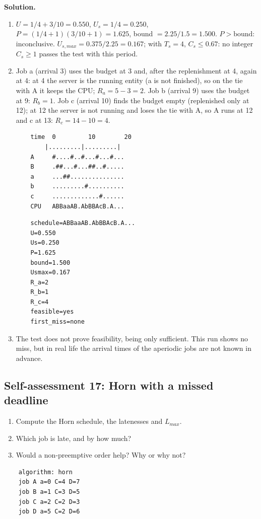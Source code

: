 \textbf{Solution.}
\begin{enumerate}
    \item $U = 1/4 + 3/10 = 0.550$, $U_s = 1/4 = 0.250$, $P = (1/4 + 1)(3/10 + 1) = 1.625$, bound $= 2.25/1.5 = 1.500$. $P > \text{bound}$: inconclusive. $U_{s,max} = 0.375/2.25 = 0.167$; with $T_s = 4$, $C_s \le 0.67$: no integer $C_s \ge 1$ passes the test with this period.
    \item Job a (arrival 3) uses the budget at 3 and, after the replenishment at 4, again at 4: at 4 the server is the running entity (a is not finished), so on the tie with A it keeps the CPU; $R_a = 5 - 3 = 2$. Job b (arrival 9) uses the budget at 9: $R_b = 1$. Job c (arrival 10) finds the budget empty (replenished only at 12); at 12 the server is not running and loses the tie with A, so A runs at 12 and c at 13: $R_c = 14 - 10 = 4$.
\begin{verbatim}
    time  0         10        20
        |.........|.........|
    A     #....#..#...#...#...
    B     .##...#...##..#.....
    a     ...##...............
    b     .........#..........
    c     .............#......
    CPU   ABBaaAB.AbBBAcB.A...
\end{verbatim}
\begin{verbatim}
    schedule=ABBaaAB.AbBBAcB.A...
    U=0.550
    Us=0.250
    P=1.625
    bound=1.500
    Usmax=0.167
    R_a=2
    R_b=1
    R_c=4
    feasible=yes
    first_miss=none
\end{verbatim}
    \item The test does not prove feasibility, being only sufficient. This run shows no miss, but in real life the arrival times of the aperiodic jobs are not known in advance.
\end{enumerate}

\subsection*{Self-assessment 17: Horn with a missed deadline}
\begin{enumerate}
    \item Compute the Horn schedule, the latenesses and $L_{max}$.
    \item Which job is late, and by how much?
    \item Would a non-preemptive order help? Why or why not?
\end{enumerate}
\begin{lstlisting}
    algorithm: horn
    job A a=0 C=4 D=7
    job B a=1 C=3 D=5
    job C a=2 C=2 D=3
    job D a=5 C=2 D=6
\end{lstlisting}

